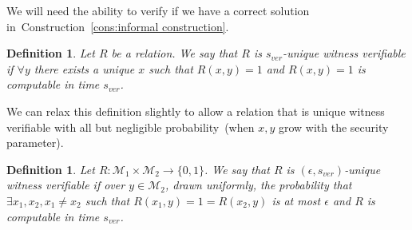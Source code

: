\documentclass[11pt]{article}
\newcommand{\consref}[1]{\mbox{Construction~\ref{#1}}}
\newcommand{\zo}{\ensuremath{\{0, 1\}}}
\newtheorem{definition}[theorem]{Definition}
\begin{document}
We will need the ability to verify if we have a correct solution in~\consref{cons:informal construction}.  

\begin{definition}
Let $R$ be a relation.  We say that $R$ is $s_{ver}$-\emph{unique witness verifiable} if $\forall y$ there exists a unique $x$ such that $R(x, y)=1$ and $R(x, y) =1$ is computable in time $s_{ver}$.
\end{definition}
We can relax this definition slightly to allow a relation that is unique witness verifiable with all but negligible probability~(when $x, y$ grow with the security parameter).

\begin{definition}
\label{def:unique witness relation}
Let $R:\mathcal{M}_1\times \mathcal{M}_2\rightarrow \zo$.  We say that $R$ is $(\epsilon, s_{ver})$-\emph{unique witness verifiable} if over $y\in \mathcal{M}_2$, drawn uniformly, the probability that $\exists x_1, x_2, x_1\neq x_2$ such that $R(x_1, y) =1 = R(x_2, y)$ is at most $\epsilon$ and $R$ is computable in time $s_{ver}$.
\end{definition}
\end{document}

